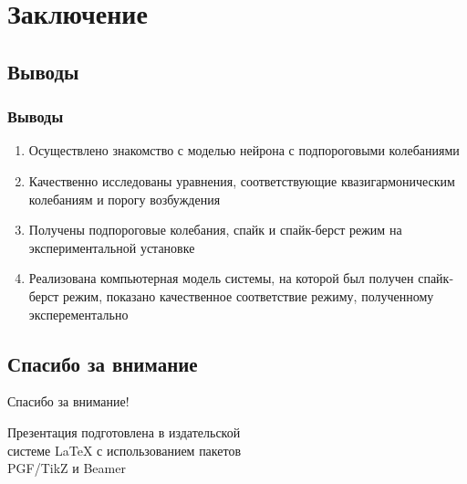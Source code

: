 \section{Заключение}
\subsection{Выводы}
\begin{frame}
	\frametitle{Выводы}
	\begin{enumerate}
		\item Осуществлено знакомство с моделью нейрона с подпороговыми колебаниями
		\item Качественно исследованы уравнения, соответствующие квазигармоническим колебаниям и порогу возбуждения
		\item Получены подпороговые колебания, спайк и спайк-берст режим на экспериментальной установке
		\item Реализована компьютерная модель системы, на которой был получен спайк-берст режим, показано качественное соответствие режиму, полученному эксперементально
	\end{enumerate}
\end{frame}
\subsection{Спасибо за внимание}
\begin{frame}[plain]
	\vspace{4cm}
	\begin{center}
		\Huge
		Спасибо за внимание!
	\end{center}
	\vspace{2.5cm}
	\begin{center}
		\color{black!60!white}
		Презентация подготовлена в издательской \\
		системе LaTeX с использованием пакетов \\
		PGF/TikZ и Beamer
	\end{center}
\end{frame}
